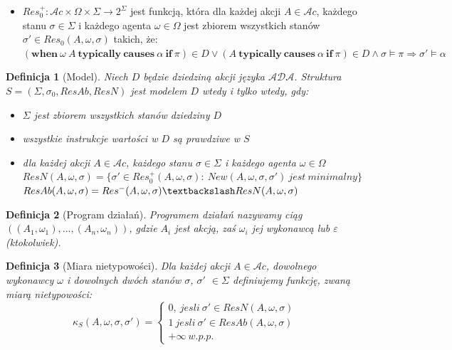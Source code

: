 \documentclass[11pt,a4paper]{article}
\newtheorem{definition}{Definicja}[section]
\begin{document}
\begin{itemize}
        \item $Res_0^+: \mathcal{A}c \times \Omega \times \Sigma \rightarrow 2^\Sigma$ jest funkcją, która dla każdej akcji $A \in \mathcal{A}c$, każdego stanu $\sigma \in \Sigma$ i każdego agenta $\omega \in \Omega$ jest zbiorem wszystkich stanów $\sigma' \in Res_0(A, \omega, \sigma)$ takich, że:\\
        $(\mathbf{when}~\omega~A~\mathbf{typically~causes}~\alpha~\mathbf{if}~\pi) \in D \vee (A~\mathbf{typically~causes}~\alpha~\mathbf{if}~\pi) \in D \wedge \sigma \models \pi \Rightarrow \sigma' \models \alpha$
    \end{itemize}
    
    \begin{definition}[Model]
    Niech $D$ będzie dziedziną akcji języka $\mathcal{ADA}$. Struktura $S=(\Sigma, \sigma_0, ResAb, ResN)$ jest modelem $D$ wtedy i tylko wtedy, gdy:
    \begin{itemize}
        \item $\Sigma$ jest zbiorem wszystkich stanów dziedziny $D$
        \item wszystkie instrukcje wartości w $D$ są prawdziwe w $S$
        \item dla każdej akcji $A \in \mathcal{A}c$, każdego stanu $\sigma \in \Sigma$ i każdego agenta $\omega \in \Omega$
        \\$ResN(A,\omega,\sigma)=\{\sigma' \in Res_0^+(A,\omega,\sigma):~ New(A,\omega,\sigma,\sigma')~jest~minimalny\}$
        \\$ResAb(A,\omega,\sigma)=Res^-(A,\omega,\sigma) \textbackslash ResN(A,\omega,\sigma)$
    \end{itemize}
    \end{definition}
    
    \begin{definition}[Program działań]
    Programem działań nazywamy ciąg $((A_1, \omega_1),...,(A_n,\omega_n))$, gdzie $A_i$ jest akcją, zaś $\omega_i$ jej wykonawcą lub $\varepsilon$ (ktokolwiek). 
    \end{definition}
    
    \begin{definition}[Miara nietypowości]
    Dla każdej akcji $A \in \mathcal{A}c$, dowolnego wykonawcy $\omega$ i dowolnych dwóch stanów $\sigma$, $\sigma'$ $\in \Sigma$ definiujemy funkcję, zwaną miarą nietypowości: \\
    \[
    \kappa_S(A, \omega, \sigma, \sigma') = \left \{
        \begin{array}{ll}
             0,~jesli~\sigma' \in ResN(A, \omega, \sigma) \\
             1~jesli~\sigma' \in ResAb(A, \omega, \sigma) \\
             + \infty ~w.p.p.
         \end{array}
     \right.
    \]
    
    \end{definition}
    
\end{document}
